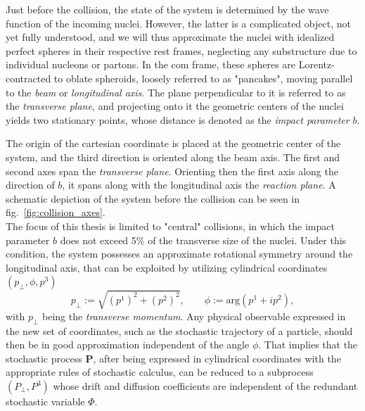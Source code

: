 \documentclass[a4paper,12pt]{book}
\begin{document}
Just before the collision, the state of the system is determined by the wave function of the incoming nuclei. However, the latter is a complicated object, not yet fully understood, and we will thus approximate the nuclei with idealized perfect spheres in their respective rest frames, neglecting any substructure due to individual nucleons or partons. In the \acrshort{com} frame, these spheres are Lorentz-contracted to oblate spheroids, loosely referred to as "pancakes", moving parallel to the \textit{beam} or \textit{longitudinal axis}. The plane perpendicular to it is referred to as the \textit{transverse plane}, and projecting onto it the geometric centers of the nuclei yields two stationary points, whose distance is denoted as the \textit{impact parameter} $b$.

The origin of the cartesian coordinate is placed at the geometric center of the system, and the third direction is oriented along the beam axis. The first and second axes span the \textit{transverse plane}. Orienting then the first axis along the direction of $b$, it spans along with the longitudinal axis the \textit{reaction plane}. A schematic depiction of the system before the collision can be seen in fig.~\ref{fig:collision_axes}.\\

The focus of this thesis is limited to "central" collisions, in which the impact parameter $b$ does not exceed 5\% of the transverse size of the nuclei. Under this condition, the system possesses an approximate rotational symmetry around the longitudinal axis, that can be exploited by utilizing cylindrical coordinates $(p_\perp,\phi,p^3)$
\begin{equation}
    p_\perp := \sqrt{(p^1)^2+(p^2)^2}, \quad \quad \phi := \text{arg}(p^1 + ip^2),
\end{equation}
with $p_\perp$ being the \textit{transverse momentum}. Any physical observable expressed in the new set of coordinates, such as the stochastic trajectory of a particle, should then be in good approximation independent of the angle $\phi$. That implies that the stochastic process $\bm{P}$, after being expressed in cylindrical coordinates with the appropriate rules of stochastic calculus, can be reduced to a subprocess $(P_\perp,P^3)$ whose drift and diffusion coefficients are independent of the redundant stochastic variable $\Phi$.  
\end{document}
